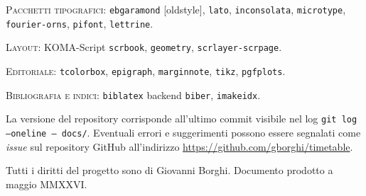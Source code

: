 \smallskip
\noindent\textsc{Pacchetti tipografici}: \texttt{ebgaramond}
[oldstyle], \texttt{lato}, \texttt{inconsolata}, \texttt{microtype},
\texttt{fourier-orns}, \texttt{pifont}, \texttt{lettrine}.

\smallskip
\noindent\textsc{Layout}: KOMA-Script \texttt{scrbook},
\texttt{geometry}, \texttt{scrlayer-scrpage}.

\smallskip
\noindent\textsc{Editoriale}: \texttt{tcolorbox}, \texttt{epigraph},
\texttt{marginnote}, \texttt{tikz}, \texttt{pgfplots}.

\smallskip
\noindent\textsc{Bibliografia e indici}: \texttt{biblatex} backend
\texttt{biber}, \texttt{imakeidx}.

\bigskip
\noindent
La versione del repository corrisponde all'ultimo commit visibile
nel log \texttt{git log --oneline -- docs/}. Eventuali errori e
suggerimenti possono essere segnalati come \emph{issue} sul
repository GitHub all'indirizzo
\url{https://github.com/gborghi/timetable}.

\bigskip
\noindent
Tutti i diritti del progetto sono di Giovanni Borghi.
Documento prodotto a maggio MMXXVI.

\vspace{0.6em}
\begin{center}
{\Large\color{cIndaco}\aldineleft\enskip\aldineright}
\end{center}
\vfill

\cleardoublepage

\tableofcontents
\listoffigures
\listoftables

\mainmatter

%
%


